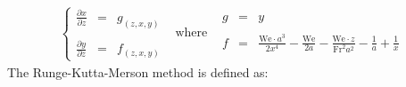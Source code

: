 \documentclass[11pt, a4paper]{article}
\begin{document}
\begin{equation}
    \begin{matrix}
        \left\{\begin{array}{rcl}
            \displaystyle\frac{\partial x}{\partial z}&=&g_{\left(z,x,y\right)} \\\\
            \displaystyle\frac{\partial y}{\partial z}&=&f_{\left(z,x,y\right)}
        \end{array}\right. &\text{where}& \begin{array}{rcl}
            g&=&y \\\\
            f&=&\displaystyle\frac{\text{We}\cdot a^3}{2x^4}-\frac{\text{We}}{2a}-\frac{\text{We}\cdot z}{\text{Fr}^2a^2}-\frac{1}{a}+\frac{1}{x}
        \end{array}
    \end{matrix}
\end{equation}
The Runge-Kutta-Merson method is defined as:
\end{document}
